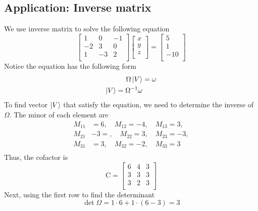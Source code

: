 \documentclass[../main.tex]{subfiles}
\begin{document}
\subsection*{Application: Inverse matrix}
We use inverse matrix to solve the following equation
\begin{equation*}
    \begin{bmatrix}
        1&0&-1\\
        -2&3&0\\
        1&-3&2\\
    \end{bmatrix}
    \begin{bmatrix}
        x\\
        y\\
        z\\
    \end{bmatrix}
    =
    \begin{bmatrix}
        5\\
        1\\
        -10\\
    \end{bmatrix}
\end{equation*}
Notice the equation has the following form
\begin{align*}
    \Omega \ket{V}&=\omega\\
    \ket{V}=\Omega^{-1}\omega
\end{align*}
To find vector $\ket{V}$ that satisfy the equation, we need to determine the inverse of $\Omega$.
The minor of each element are
\begin{align*}
	M_{11} & =6 , \quad
	M_{12} = -4, \quad
	M_{13} = 3,         \\
	M_{21} & -3= , \quad
	M_{22} = 3, \quad
	M_{23} = -3,         \\
	M_{31} & = 3, \quad
	M_{32} = -2, \quad
	M_{33} =3\\ 
\end{align*}
Thus, the cofactor is 
\begin{equation*}
    \text{C}=\begin{bmatrix}
        6&4&3\\
        3&3&3\\
        3&2&3\\
    \end{bmatrix}
\end{equation*}
Next, using the first row to find the determinant
\begin{equation*}
    \det\Omega=1\cdot6+1\cdot(6-3)=3
\end{equation*}
\end{document}
